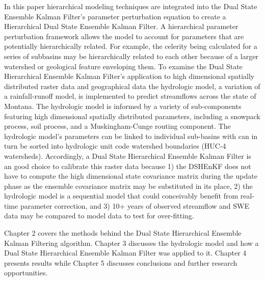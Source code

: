 	In this paper hierarchical modeling techniques are integrated into the Dual State Ensemble Kalman Filter's parameter perturbation equation to create a Hierarchical Dual State Ensemble Kalman Filter. A hierarchical parameter perturbation framework allows the model to account for parameters that are potentially hierarchically related. For example, the celerity being calculated for a series of subbasins may be hierarchically related to each other because of a larger watershed or geological feature enveloping them. To examine the Dual State Hierarchical Ensemble Kalman Filter's application to high dimensional spatially distributed raster data and geographical data the hydrologic model, a variation of a rainfall-runoff model, is implemented to predict streamflows across the state of Montana. The hydrologic model is informed by a variety of sub-components featuring high dimensional spatially distributed parameters, including a snowpack process, soil process, and a Muskingham-Cunge routing component. The hydrologic model's parameters can be linked to individual sub-basins with can in turn be sorted into hydrologic unit code watershed boundaries (HUC-4 watersheds). Accordingly, a Dual State Hierarchical Ensemble Kalman Filter is an good choice to calibrate this raster data because 1) the DSHEnKF does not have to compute the high dimensional state covariance matrix during the update phase as the ensemble covariance matrix may be substituted in its place, 2) the hydrologic model is a sequential model that could conceivably benefit from real-time parameter correction, and 3) 10+ years of observed streamflow and SWE data may be compared to model data to test for over-fitting.
	
	Chapter 2 covers the methods behind the Dual State Hierarchical Ensemble Kalman Filtering algorithm. Chapter 3 discusses the hydrologic model and how a Dual State Hierarchical Ensemble Kalman Filter was applied to it. Chapter 4 presents results while Chapter 5 discusses conclusions and further research opportunities.
	
	